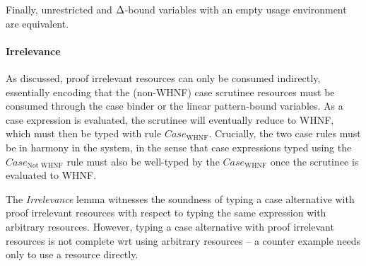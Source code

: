 \documentclass[acmsmall,review,anonymous,screen]{acmart}
\begin{document}
\DeltaLinearRelationLemma


\noindent Finally, unrestricted and $\Delta$-bound
variables with an empty usage environment are equivalent.

\DeltaUnrestrictedRelationLemma

\paragraph{Irrelevance}
%
As discussed, proof irrelevant resources can only be consumed
indirectly, essentially encoding that the (non-WHNF) case scrutinee
resources must be consumed through the case binder or the linear
pattern-bound variables.
%
As a case expression is evaluated, the scrutinee will eventually
reduce to WHNF,
which must then be typed with rule $Case_{\textrm{WHNF}}$.
%
Crucially, the two case rules must be in harmony in the system, in the sense that
case expressions typed using the $Case_{\textrm{Not WHNF}}$ rule must also be
well-typed by the $Case_{\textrm{WHNF}}$ once the scrutinee is evaluated to WHNF.



\WHNFConvSoundness

The \emph{Irrelevance} lemma witnesses the soundness of typing a
case alternative with proof irrelevant resources with respect to
typing the same expression with arbitrary resources. However, typing
a case alternative with proof irrelevant resources is not complete wrt using
arbitrary resources -- a counter example needs only to use a resource
directly.
\end{document}
